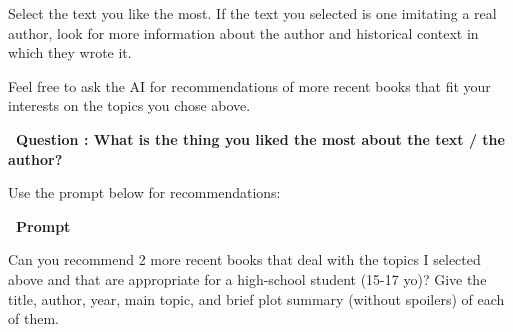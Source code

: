 \documentclass[12pt]{article}
\newcounter{question}
\newcommand{\question}[2][5cm]{%
  \stepcounter{question}
  \vspace{0.3cm}
  \textbf{\faEdit\ Question \thequestion: #2} \\[0.3em]
  
  \begin{Form}
  \TextField[
    name=Q\thequestion,
    multiline=true,
    width=\linewidth,
    height=#1,
    charsize=10pt,
    bordercolor={0 0 0},
    borderwidth=1.8,
    backgroundcolor={1 1 1}
  ]{}
  \end{Form}
  
  \vspace{0.3cm}
}
\begin{document}
\vspace{0.3cm}
Select the text you like the most. If the text you selected is one imitating a real author, look for more information about the author and historical context in which they wrote it.

Feel free to ask the AI for recommendations of more recent books that fit your interests on the topics you chose above.

\question{What is the thing you liked the most about the text / the author?}

Use the prompt below for recommendations:

\vspace{0.3cm}
\textcolor{maincolor}{\textbf{\faCopy\ Prompt}}
\begin{promptbox}
Can you recommend 2 more recent books that deal with the topics I selected above and that are appropriate for a high-school student (15-17 yo)? Give the title, author, year, main topic, and brief plot summary (without spoilers) of each of them.
\end{promptbox}
\end{document}
